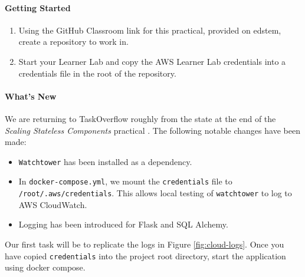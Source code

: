 \documentclass{csse4400}
\begin{document}
\paragraph{Getting Started}
\begin{enumerate}
    \item Using the GitHub Classroom link for this practical, provided on edstem, create a repository to work in.
    \item Start your Learner Lab and copy the AWS Learner Lab credentials into a credentials file in the root of the repository.
\end{enumerate}

\paragraph{What's New}
We are returning to TaskOverflow roughly from the state at the end of the
\textit{Scaling Stateless Components} practical \cite{prac-week6}.
The following notable changes have been made:
\begin{itemize}
    \item \texttt{Watchtower} has been installed as a dependency.
    \item In \texttt{docker-compose.yml}, we mount the \texttt{credentials} file to \texttt{/root/.aws/credentials}.
        This allows local testing of \texttt{watchtower} to log to AWS CloudWatch.
    \item Logging has been introduced for Flask and SQL Alchemy.
\end{itemize}

Our first task will be to replicate the logs in Figure \ref{fig:cloud-logs}.
Once you have copied \texttt{credentials} into the project root directory,
start the application using docker compose.
\end{document}
